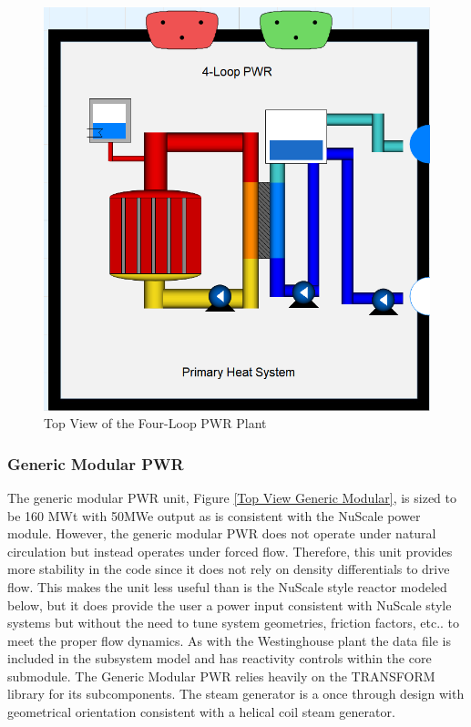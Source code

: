 \begin{figure}[hbtp]
\centering
\includegraphics[scale=0.3]{pics/Westinghouse.png}
\caption{Top View of the Four-Loop PWR Plant}
\label{Top View Westinghouse}
\end{figure}


\subsubsection{Generic Modular PWR}
The generic modular PWR unit, Figure \ref{Top View Generic Modular}, is sized to be 160 MWt with 50MWe output as is consistent with the NuScale power module. However, the generic modular PWR does not operate under natural circulation but instead operates under forced flow. Therefore, this unit provides more stability in the code since it does not rely on density differentials to drive flow. This makes the unit less useful than is the NuScale style reactor modeled below, but it does provide the user a power input consistent with NuScale style systems but without the need to tune system geometries, friction factors, etc.. to meet the proper flow dynamics. As with the Westinghouse plant the data file is included in the subsystem  model and has reactivity controls within the core submodule. The Generic Modular PWR relies heavily on the TRANSFORM library for its subcomponents. The steam generator is a once through design with geometrical orientation consistent with a helical coil steam generator. 


